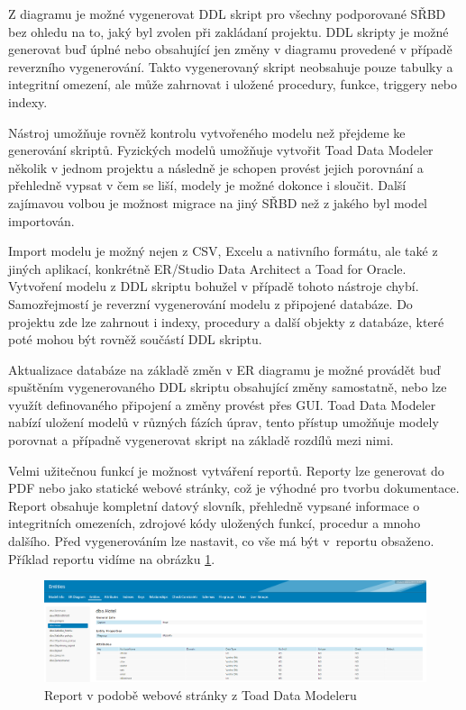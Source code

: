 \documentclass[czech,bachelor,public,dept460,male,oneside]{diploma}
\begin{document}
		Z diagramu je možné vygenerovat DDL skript pro všechny podporované SŘBD bez ohledu na to, jaký byl zvolen při zakládaní projektu. DDL skripty je možné generovat buď úplné nebo obsahující jen změny v diagramu provedené v případě reverzního vygenerování. Takto vygenerovaný skript neobsahuje pouze tabulky a integritní omezení, ale může zahrnovat i uložené procedury, funkce, triggery nebo indexy. 
		
		Nástroj umožňuje rovněž kontrolu vytvořeného modelu než přejdeme ke generování skriptů. Fyzických modelů umožňuje vytvořit Toad Data Modeler několik v jednom projektu a následně je schopen provést jejich porovnání a přehledně vypsat v čem se liší, modely je možné dokonce i sloučit. Další zajímavou volbou je možnost migrace na jiný SŘBD než z jakého byl model importován.
		
		Import modelu je možný nejen z CSV, Excelu a nativního formátu, ale také z jiných aplikací, konkrétně ER/Studio Data Architect a Toad for Oracle. Vytvoření modelu z DDL skriptu bohužel v případě tohoto nástroje chybí. Samozřejmostí je reverzní vygenerování modelu z připojené databáze. Do projektu zde lze zahrnout i indexy, procedury a další objekty z databáze, které poté mohou být rovněž součástí DDL skriptu.
		
		Aktualizace databáze na základě změn v ER diagramu je možné provádět buď spuštěním vygenerovaného DDL skriptu obsahující změny samostatně, nebo lze využít definovaného připojení a změny provést přes GUI. Toad Data Modeler nabízí uložení modelů v různých fázích úprav, tento přístup umožňuje modely porovnat a případně vygenerovat skript na základě rozdílů mezi nimi.
		
		Velmi užitečnou funkcí je možnost vytváření reportů. Reporty lze generovat do PDF nebo jako statické webové stránky, což je výhodné pro tvorbu dokumentace. Report obsahuje kompletní datový slovník, přehledně vypsané informace o integritních omezeních, zdrojové kódy uložených funkcí, procedur a mnoho dalšího. Před vygenerováním lze nastavit, co vše má být v~reportu obsaženo. Příklad reportu vidíme na obrázku \ref{fig:toadReport}.
		
		\begin{figure}[!h]
			\centering
			\includegraphics[width=1\textwidth]{Figures/EditorToadReport}
			\caption[Report v podobě webové stránky z Toad Data Modeleru]{Report v podobě webové stránky z Toad Data Modeleru}
			\label{fig:toadReport}
		\end{figure}
		
\end{document}

